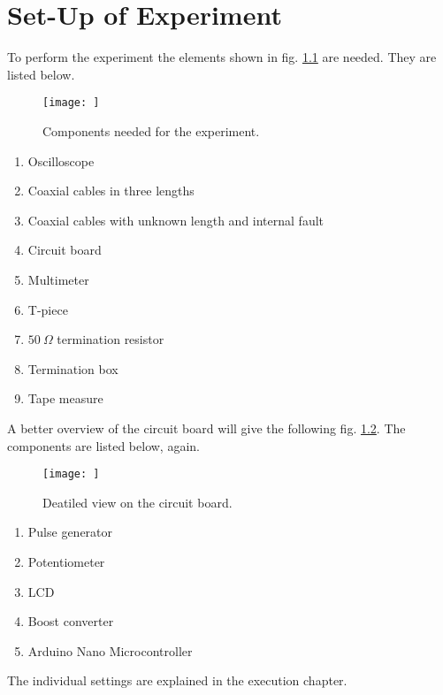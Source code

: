 \chapter{Set-Up of Experiment}
To perform the experiment the elements shown in fig. \ref{fig:setup} are needed. They are listed below.
%
\begin{figure}[H]
	\begin{center}
		\texttt{[image: ]} %
		\caption{Components needed for the experiment.}  
		\label{fig:setup}
	\end{center}
\end{figure}
%
\begin{enumerate}
	\item Oscilloscope
	\item Coaxial cables in three lengths
	\item Coaxial cables with unknown length and internal fault
	\item Circuit board
	\item Multimeter
	\item T-piece
	\item $50\ \Omega$ termination resistor
	\item Termination box
	\item Tape measure
\end{enumerate}
%
A better overview of the circuit board will give the following fig. \ref{fig:circuit_board}. The components are listed
below, again.
%
\begin{figure}[H]
	\begin{center}
		\texttt{[image: ]} %
		\caption{Deatiled view on the circuit board.}  
		\label{fig:circuit_board}
	\end{center}
\end{figure}
%
\begin{enumerate}
	\item Pulse generator
	\item Potentiometer
	\item LCD
	\item Boost converter
	\item Arduino Nano Microcontroller
\end{enumerate}
%
The individual settings are explained in the execution chapter.